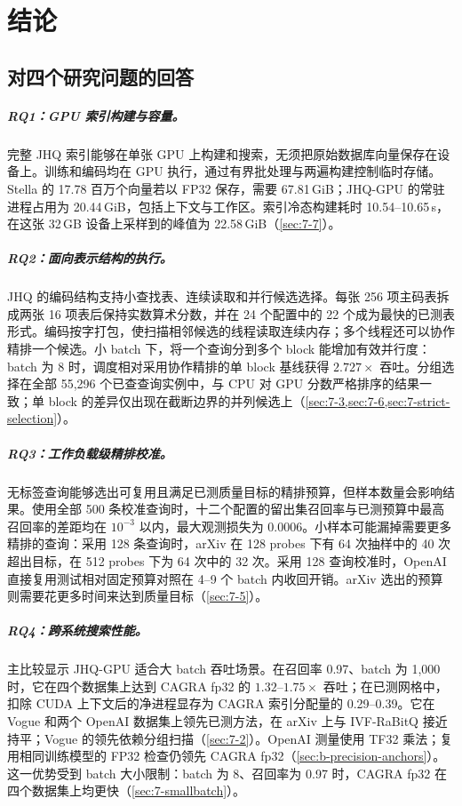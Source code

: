 \chapter{结论}
\label{ch:conclusion}

\section{对四个研究问题的回答}
\label{sec:9-1}

\paragraph{RQ1：GPU 索引构建与容量。}
完整 JHQ 索引能够在单张 GPU 上构建和搜索，无须把原始数据库向量保存在设备上。训练和编码均在 GPU 执行，通过有界批处理与两遍构建控制临时存储。Stella 的 17.78 百万个向量若以 FP32 保存，需要 67.81\,GiB；JHQ-GPU 的常驻进程占用为 20.44\,GiB，包括上下文与工作区。索引冷态构建耗时 10.54--10.65\,s，在这张 32\,GB 设备上采样到的峰值为 22.58\,GiB（\cref{sec:7-7}）。

\paragraph{RQ2：面向表示结构的执行。}
JHQ 的编码结构支持小查找表、连续读取和并行候选选择。每张 256 项主码表拆成两张 16 项表后保持实数算术分数，并在 24 个配置中的 22 个成为最快的已测表形式。编码按字打包，使扫描相邻候选的线程读取连续内存；多个线程还可以协作精排一个候选。小 batch 下，将一个查询分到多个 block 能增加有效并行度：batch 为 8 时，调度相对采用协作精排的单 block 基线获得 $2.727\times$ 吞吐。分组选择在全部 55,296 个已查查询实例中，与 CPU 对 GPU 分数严格排序的结果一致；单 block 的差异仅出现在截断边界的并列候选上（\cref{sec:7-3,sec:7-6,sec:7-strict-selection}）。

\paragraph{RQ3：工作负载级精排校准。}
无标签查询能够选出可复用且满足已测质量目标的精排预算，但样本数量会影响结果。使用全部 500 条校准查询时，十二个配置的留出集召回率与已测预算中最高召回率的差距均在 $10^{-3}$ 以内，最大观测损失为 0.0006。小样本可能漏掉需要更多精排的查询：采用 128 条查询时，arXiv 在 128 probes 下有 64 次抽样中的 40 次超出目标，在 512 probes 下为 64 次中的 32 次。采用 128 查询校准时，OpenAI 直接复用测试相对固定预算对照在 4--9 个 batch 内收回开销。arXiv 选出的预算则需要花更多时间来达到质量目标（\cref{sec:7-5}）。

\paragraph{RQ4：跨系统搜索性能。}
主比较显示 JHQ-GPU 适合大 batch 吞吐场景。在召回率 0.97、batch 为 1,000 时，它在四个数据集上达到 CAGRA fp32 的 $1.32$--$1.75\times$ 吞吐；在已测网格中，扣除 CUDA 上下文后的净进程显存为 CAGRA 索引分配量的 0.29--0.39。它在 Vogue 和两个 OpenAI 数据集上领先已测方法，在 arXiv 上与 IVF-RaBitQ 接近持平；Vogue 的领先依赖分组扫描（\cref{sec:7-2}）。OpenAI 测量使用 TF32 乘法；复用相同训练模型的 FP32 检查仍领先 CAGRA fp32（\cref{sec:b-precision-anchors}）。这一优势受到 batch 大小限制：batch 为 8、召回率为 0.97 时，CAGRA fp32 在四个数据集上均更快（\cref{sec:7-smallbatch}）。

